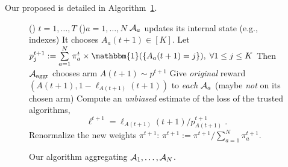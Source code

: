 Our proposed \Aggr{} is detailed in Algorithm~\ref{algo:25:Aggr}.
%
\begin{small}
	\begin{figure}[h!]
		\centering
		\begin{framed}
		\begin{algorithm}[H]
			\For()
            {$t = 1, \dots, T$}{
				\For(){$a = 1, \dots, N$}{
					$\Alg_a$ updates its internal state (e.g., \UCB{} indexes)\;
					It chooses $A_a(t+1) \in [K]$.
				}
				Let $p^{t+1}_j := \sum\limits_{a = 1}^{N} \pi^{t}_a \times \mathbbm{1}(\{A_a(t+1) = j\}), \;\forall 1\leq j \leq K$\;
				Then $\mathcal{A}_{\mathrm{aggr}}$ chooses arm $A(t+1) \sim p^{t+1}$\;
				Give \emph{original} reward $(A(t+1), 1 - \ell_{A(t+1)}(t+1))$ to \emph{each} $\Alg_a$ (maybe \emph{not} on its chosen arm)\;
				Compute an \emph{unbiased} estimate of the loss of the trusted algorithms,$$ \ell^{t+1} = \ell_{A(t+1)}(t+1) / p^{t+1}_{A(t+1)}\;. $$
				\For{$a = 1, \dots, N$}{
					\eIf{$\Alg_a$ was trusted, \ie, $A_a(t+1) = A(t+1)$}{
						$ \pi^{t+1}_{a} = \exp(\eta_t \ell^{t+1}) \times \pi^{t}_{a} $
						\tcp*{Trusted more}
						}{
						$ \pi^{t+1}_{a} = \pi^{t}_{a} $
						\tcp*{Do not update the trust now}
					}
				}
				Renormalize the new weights $\pi^{t+1}$: $\pi^{t+1} := \pi^{t+1} / \sum_{a=1}^{N} \pi^{t+1}_{a}$.
			}
			\caption{Our algorithm \Aggr{} aggregating $\mathcal{A}_1,\dots,\mathcal{A}_N$.}
			\label{algo:25:Aggr}
		\end{algorithm}
		\end{framed}
	\end{figure}
\end{small}


